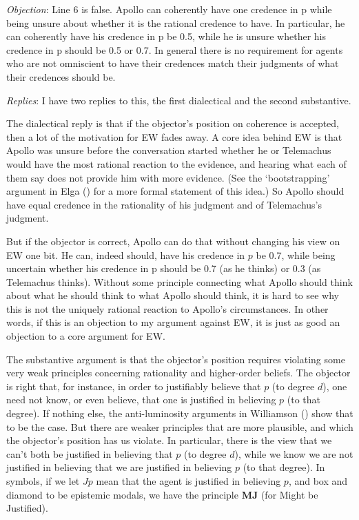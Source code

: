 \documentclass[
  11pt,
  letterpaper,
  DIV=11,
  numbers=noendperiod,
  oneside]{scrartcl}
\begin{document}
\emph{Objection}: Line 6 is false. Apollo can coherently have one
credence in p while being unsure about whether it is the rational
credence to have. In particular, he can coherently have his credence in
p be 0.5, while he is unsure whether his credence in p should be 0.5 or
0.7. In general there is no requirement for agents who are not
omniscient to have their credences match their judgments of what their
credences should be.

\emph{Replies}: I have two replies to this, the first dialectical and
the second substantive.

The dialectical reply is that if the objector's position on coherence is
accepted, then a lot of the motivation for EW fades away. A core idea
behind EW is that Apollo was unsure before the conversation started
whether he or Telemachus would have the most rational reaction to the
evidence, and hearing what each of them say does not provide him with
more evidence. (See the `bootstrapping' argument in Elga
() for a more formal statement of
this idea.) So Apollo should have equal credence in the rationality of
his judgment and of Telemachus's judgment.

But if the objector is correct, Apollo can do that without changing his
view on EW one bit. He can, indeed should, have his credence in \(p\) be
0.7, while being uncertain whether his credence in p should be 0.7 (as
he thinks) or 0.3 (as Telemachus thinks). Without some principle
connecting what Apollo should think about what he should think to what
Apollo should think, it is hard to see why this is not the uniquely
rational reaction to Apollo's circumstances. In other words, if this is
an objection to my argument against EW, it is just as good an objection
to a core argument for EW.

The substantive argument is that the objector's position requires
violating some very weak principles concerning rationality and
higher-order beliefs. The objector is right that, for instance, in order
to justifiably believe that \(p\) (to degree \(d\)), one need not know,
or even believe, that one is justified in believing \(p\) (to that
degree). If nothing else, the anti-luminosity arguments in Williamson
() show that to be the case.
But there are weaker principles that are more plausible, and which the
objector's position has us violate. In particular, there is the view
that we can't both be justified in believing that \(p\) (to degree
\(d\)), while we know we are not justified in believing that we are
justified in believing \(p\) (to that degree). In symbols, if we let
\(Jp\) mean that the agent is justified in believing \(p\), and box and
diamond to be epistemic modals, we have the principle \textbf{MJ} (for
Might be Justified).
\end{document}
